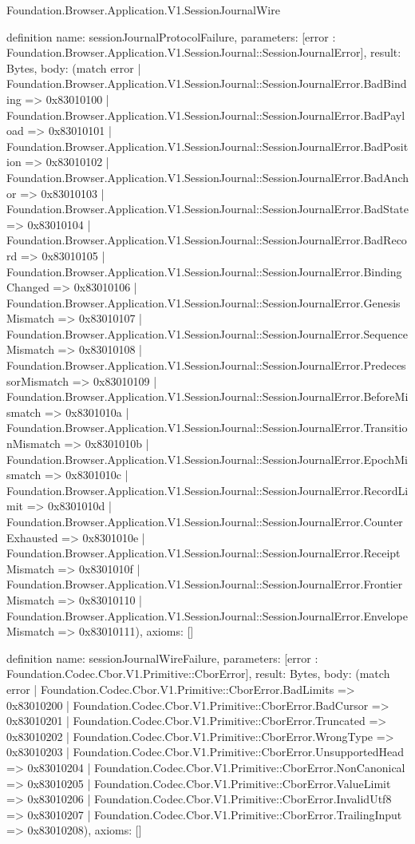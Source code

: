 \begin{lexlean}{Foundation.Browser.Application.V1.SessionJournalWire}
\begin{semanticmodule}
definition{
  name: sessionJournalProtocolFailure,
  parameters: [error : Foundation.Browser.Application.V1.SessionJournal::SessionJournalError],
  result: Bytes,
  body: (match error
    | Foundation.Browser.Application.V1.SessionJournal::SessionJournalError.BadBinding => 0x83010100
    | Foundation.Browser.Application.V1.SessionJournal::SessionJournalError.BadPayload => 0x83010101
    | Foundation.Browser.Application.V1.SessionJournal::SessionJournalError.BadPosition => 0x83010102
    | Foundation.Browser.Application.V1.SessionJournal::SessionJournalError.BadAnchor => 0x83010103
    | Foundation.Browser.Application.V1.SessionJournal::SessionJournalError.BadState => 0x83010104
    | Foundation.Browser.Application.V1.SessionJournal::SessionJournalError.BadRecord => 0x83010105
    | Foundation.Browser.Application.V1.SessionJournal::SessionJournalError.BindingChanged => 0x83010106
    | Foundation.Browser.Application.V1.SessionJournal::SessionJournalError.GenesisMismatch => 0x83010107
    | Foundation.Browser.Application.V1.SessionJournal::SessionJournalError.SequenceMismatch => 0x83010108
    | Foundation.Browser.Application.V1.SessionJournal::SessionJournalError.PredecessorMismatch => 0x83010109
    | Foundation.Browser.Application.V1.SessionJournal::SessionJournalError.BeforeMismatch => 0x8301010a
    | Foundation.Browser.Application.V1.SessionJournal::SessionJournalError.TransitionMismatch => 0x8301010b
    | Foundation.Browser.Application.V1.SessionJournal::SessionJournalError.EpochMismatch => 0x8301010c
    | Foundation.Browser.Application.V1.SessionJournal::SessionJournalError.RecordLimit => 0x8301010d
    | Foundation.Browser.Application.V1.SessionJournal::SessionJournalError.CounterExhausted => 0x8301010e
    | Foundation.Browser.Application.V1.SessionJournal::SessionJournalError.ReceiptMismatch => 0x8301010f
    | Foundation.Browser.Application.V1.SessionJournal::SessionJournalError.FrontierMismatch => 0x83010110
    | Foundation.Browser.Application.V1.SessionJournal::SessionJournalError.EnvelopeMismatch => 0x83010111),
  axioms: []
}

definition{
  name: sessionJournalWireFailure,
  parameters: [error : Foundation.Codec.Cbor.V1.Primitive::CborError],
  result: Bytes,
  body: (match error
    | Foundation.Codec.Cbor.V1.Primitive::CborError.BadLimits => 0x83010200
    | Foundation.Codec.Cbor.V1.Primitive::CborError.BadCursor => 0x83010201
    | Foundation.Codec.Cbor.V1.Primitive::CborError.Truncated => 0x83010202
    | Foundation.Codec.Cbor.V1.Primitive::CborError.WrongType => 0x83010203
    | Foundation.Codec.Cbor.V1.Primitive::CborError.UnsupportedHead => 0x83010204
    | Foundation.Codec.Cbor.V1.Primitive::CborError.NonCanonical => 0x83010205
    | Foundation.Codec.Cbor.V1.Primitive::CborError.ValueLimit => 0x83010206
    | Foundation.Codec.Cbor.V1.Primitive::CborError.InvalidUtf8 => 0x83010207
    | Foundation.Codec.Cbor.V1.Primitive::CborError.TrailingInput => 0x83010208),
  axioms: []
}


\end{semanticmodule}
\end{lexlean}
